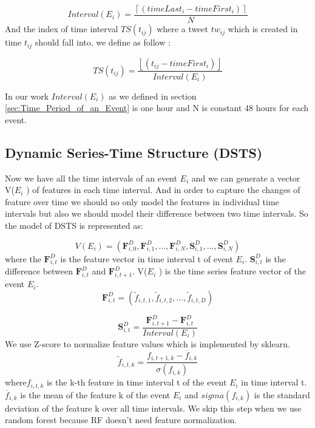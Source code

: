 \begin{equation}
Interval(E_i)=\frac{\left \lceil { (timeLast_i-timeFirst_i) }\right \rceil}{N}
\end{equation}
And the index of time interval $TS(t_{ij})$ where a tweet $tw_{ij}$ which is created in time $t_{ij}$ should fall into, we define as follow :

\begin{equation}
TS(t_{ij})=\frac{\left \lfloor { (t_{ij}-timeFirst_i) }\right \rfloor}{Interval(E_i)}
\end{equation}

In our work $Interval(E_i)$ as we defined in section \ref{sec:Time_Period_of_an_Event} is one hour and N is constant 48 hours for each event.  
   
   \subsection{ Dynamic Series-Time Structure (DSTS)} 
Now we have all the time intervals of an event $E_i$ and we can generate a vector V($E_i$ ) of features in each time interval. And in order to capture the changes of feature over time we should no only model the features in individual time intervals but also we should model their difference between two time intervals. So the model of  DSTS is represented as:  

\begin{equation}
 V(E_i)=(\textbf{F}^D_{i,0}, \textbf{F}^D_{i,1},..., \textbf{F}^D_{i,N},\textbf{S}^D_{i,1},..., \textbf{S}^D_{i,N})
\end{equation}
where the $\textbf{F}^D_{i,t}$ is the feature vector in time interval t of event $E_i$.  $\textbf{S}^D_{i,t}$ is the difference between $\textbf{F}^D_{i,t}$ and $\textbf{F}^D_{i,t+1}$. V($E_i$ ) is the time series feature vector of the event $E_i$.
\begin{equation}
\textbf{F}^D_{i,t}=(\widetilde{ f}_{i,t,1},\widetilde{ f}_{i,t,2},...,\widetilde{ f}_{i,t,D})
\end{equation}

\begin{equation}
\textbf{S}^D_{i,t}=\frac{\textbf{F}^D_{i,t+1}-\textbf{F}^D_{i,t}}{Interval(E_i)}
\end{equation}
We use Z-score to normalize feature values which is implemented by sklearn.
\begin{equation}
\widetilde{f}_{i,t,k}=\frac{f_{i,t+1,k}-\overline{f}_{i,k}}{\sigma(f_{i,k})}
\end{equation}
where$f_{i,t,k}$ is the k-th feature in time interval t of the event $E_i$ in time interval t. $\overline{f}_{i,k}$ is the mean of the feature k of the event $E_i$ and $sigma(f_{i,k})$ is the standard deviation of the feature k over all time intervals. We skip this step when we use random forest because RF doesn't need feature normalization.

